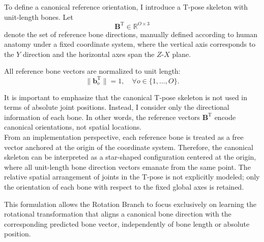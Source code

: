 To define a canonical reference orientation, I introduce a T-pose skeleton with unit-length bones. Let
\begin{equation}
    \mathbf{B}^{\text{T}} \in \mathbb{R}^{O \times 3}
\end{equation}
denote the set of reference bone directions, manually defined according to human anatomy under a fixed coordinate system, where the vertical axis corresponds to the $Y$ direction and the horizontal axes span the $Z$-$X$ plane.

All reference bone vectors are normalized to unit length:
\begin{equation}
    \|\mathbf{b}^{\text{T}}_o\| = 1, \quad \forall o \in \{1, \dots, O\}.
\end{equation}

It is important to emphasize that the canonical T-pose skeleton is not used in terms of absolute joint positions. Instead, I consider only the directional information of each bone. In other words, the 
reference vectors $\mathbf{B}^{\text{T}}$ encode canonical orientations, not spatial locations.\\
From an implementation perspective, each reference bone is treated as a free vector anchored at the origin of the coordinate system. Therefore, the canonical skeleton can be interpreted as a star-shaped 
configuration centered at the origin, where all unit-length bone direction vectors emanate from the same point. The relative spatial arrangement of joints in the T-pose is not explicitly modeled; only the 
orientation of each bone with respect to the fixed global axes is retained.

This formulation allows the Rotation Branch to focus exclusively on learning the rotational transformation that aligns a canonical bone direction with the corresponding predicted bone vector, independently 
of bone length or absolute position.

